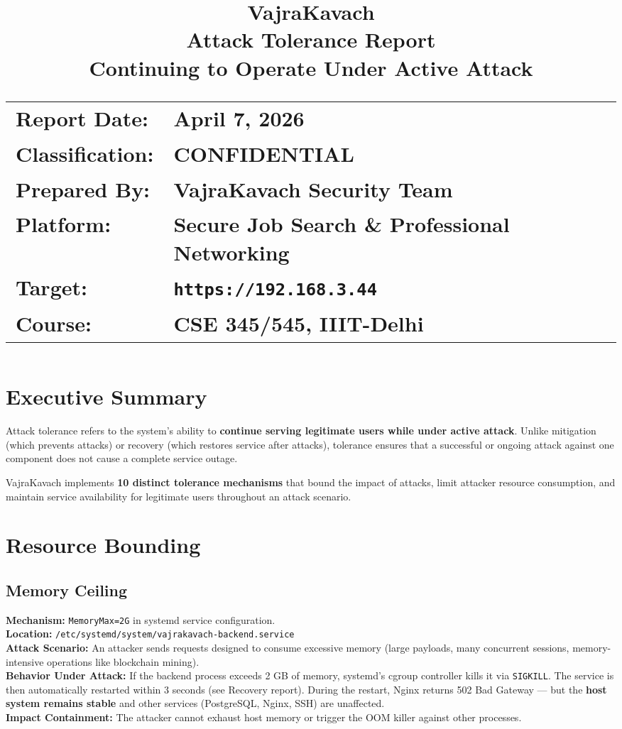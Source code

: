 \documentclass[11pt,a4paper]{article}
\title{
  \vspace{-1cm}
  \textbf{\Huge VajraKavach}\\[0.3cm]
  \textbf{\Large Attack Tolerance Report}\\[0.3cm]
  \large Continuing to Operate Under Active Attack\\[0.8cm]
  \normalsize
  \begin{tabular}{ll}
    \textbf{Report Date:} & April 7, 2026 \\
    \textbf{Classification:} & CONFIDENTIAL \\
    \textbf{Prepared By:} & VajraKavach Security Team \\
    \textbf{Platform:} & Secure Job Search \& Professional Networking \\
    \textbf{Target:} & \texttt{https://192.168.3.44} \\
    \textbf{Course:} & CSE 345/545, IIIT-Delhi \\
  \end{tabular}
}
\author{}
\date{}
\begin{document}
\maketitle
\thispagestyle{fancy}

\newpage
\tableofcontents
\newpage

\section{Executive Summary}

Attack tolerance refers to the system's ability to \textbf{continue serving legitimate users while under active attack}. Unlike mitigation (which prevents attacks) or recovery (which restores service after attacks), tolerance ensures that a successful or ongoing attack against one component does not cause a complete service outage.

VajraKavach implements \textbf{10 distinct tolerance mechanisms} that bound the impact of attacks, limit attacker resource consumption, and maintain service availability for legitimate users throughout an attack scenario.

\section{Resource Bounding}

\subsection{Memory Ceiling}

\begin{tcolorbox}[colback=toleranceamber!5, colframe=toleranceamber]
\textbf{Mechanism:} \texttt{MemoryMax=2G} in systemd service configuration.\\
\textbf{Location:} \texttt{/etc/systemd/system/vajrakavach-backend.service}\\
\textbf{Attack Scenario:} An attacker sends requests designed to consume excessive memory (large payloads, many concurrent sessions, memory-intensive operations like blockchain mining).\\
\textbf{Behavior Under Attack:} If the backend process exceeds 2 GB of memory, systemd's cgroup controller kills it via \texttt{SIGKILL}. The service is then automatically restarted within 3 seconds (see Recovery report). During the restart, Nginx returns 502 Bad Gateway — but the \textbf{host system remains stable} and other services (PostgreSQL, Nginx, SSH) are unaffected.\\
\textbf{Impact Containment:} The attacker cannot exhaust host memory or trigger the OOM killer against other processes.
\end{tcolorbox}
\end{document}
